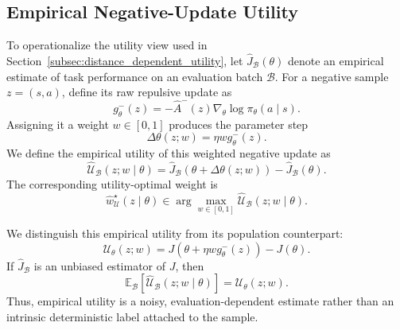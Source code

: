 \documentclass[sigconf,anonymous,review]{acmart}
\theoremstyle{acmdefinition}
\begin{document}
\subsection{Empirical Negative-Update Utility}
\label{app:negative_update_utility}

To operationalize the utility view used in
Section~\ref{subsec:distance_dependent_utility}, let
\(\widehat J_{\mathcal B}(\theta)\) denote an empirical estimate of task
performance on an evaluation batch \(\mathcal B\). For a negative sample
\(z=(s,a)\), define its raw repulsive update as
\begin{equation}
    g_\theta^-(z)
    =
    -\widehat A^-(z)
    \nabla_\theta \log \pi_\theta(a\mid s).
    \label{eq:raw_negative_update}
\end{equation}
Assigning it a weight \(w\in[0,1]\) produces the parameter step
\begin{equation}
    \Delta\theta(z;w)
    =
    \eta w g_\theta^-(z).
    \label{eq:weighted_negative_step}
\end{equation}
We define the empirical utility of this weighted negative update as
\begin{equation}
    \widehat{\mathcal U}_{\mathcal B}
    (z;w\mid\theta)
    =
    \widehat J_{\mathcal B}
    \!\left(
        \theta+\Delta\theta(z;w)
    \right)
    -
    \widehat J_{\mathcal B}(\theta).
    \label{eq:app_empirical_negative_update_utility}
\end{equation}
The corresponding utility-optimal weight is
\begin{equation}
    \widehat w_{\mathcal U}^{\star}(z\mid\theta)
    \in
    \arg\max_{w\in[0,1]}
    \widehat{\mathcal U}_{\mathcal B}(z;w\mid\theta).
    \label{eq:empirical_utility_optimal_weight}
\end{equation}

We distinguish this empirical utility from its population counterpart:
\begin{equation}
    \mathcal U_\theta(z;w)
    =
    J\!\left(
        \theta+\eta w g_\theta^-(z)
    \right)
    -
    J(\theta).
    \label{eq:population_negative_update_utility}
\end{equation}
If \(\widehat J_{\mathcal B}\) is an unbiased estimator of \(J\), then
\begin{equation}
    \mathbb E_{\mathcal B}
    \left[
        \widehat{\mathcal U}_{\mathcal B}(z;w\mid\theta)
    \right]
    =
    \mathcal U_\theta(z;w).
    \label{eq:empirical_utility_unbiased}
\end{equation}
Thus, empirical utility is a noisy, evaluation-dependent estimate rather
than an intrinsic deterministic label attached to the sample.
\end{document}
